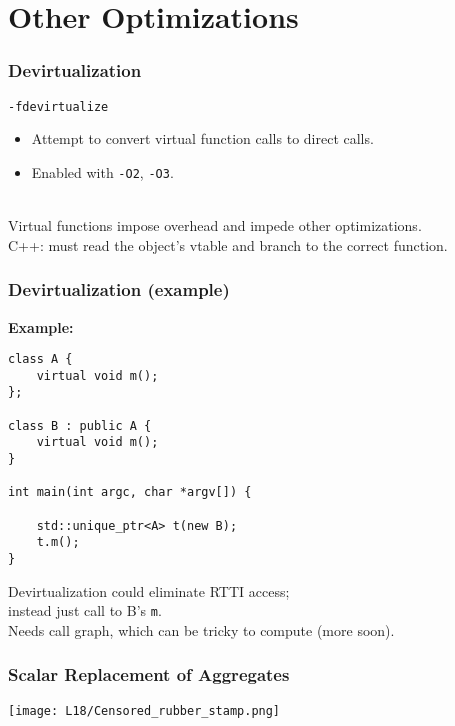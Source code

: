 \documentclass[aspectratio=43]{beamer}
\newenvironment{changemargin}[1]{%
  \begin{list}{}{%
    \setlength{\topsep}{0pt}%
    \setlength{\leftmargin}{#1}%
    \setlength{\rightmargin}{1em}
    \setlength{\listparindent}{\parindent}%
    \setlength{\itemindent}{\parindent}%
    \setlength{\parsep}{\parskip}%
  }%
  \item[]}{\end{list}}
\begin{document}
\section{Other Optimizations}
\begin{frame}
  \frametitle{Devirtualization}

  \begin{changemargin}{2cm}
  {\tt -fdevirtualize}

  \begin{itemize}
    \item Attempt to convert virtual function calls to direct calls.
    \item Enabled with {\tt -O2}, {\tt -O3}.
  \end{itemize}
~\\[1em]

  Virtual functions impose overhead and impede other optimizations.\\[1em]
  C++: must read
  the object's vtable and branch to
  the correct function.
  \end{changemargin}
\end{frame}

\begin{frame}[fragile]
  \frametitle{Devirtualization (example)}
  \begin{changemargin}{2cm}

  {\bf Example:}

  \begin{lstlisting}
class A {
    virtual void m();
};

class B : public A {
    virtual void m();
}

int main(int argc, char *argv[]) {

    std::unique_ptr<A> t(new B);
    t.m();
}
  \end{lstlisting}
  Devirtualization could eliminate RTTI access; \\ \qquad instead just call to B's {\tt m}.\\
  Needs call graph, which can be tricky to compute (more soon).
  \end{changemargin}
\end{frame}

\begin{frame}[fragile]
  \frametitle{Scalar Replacement of Aggregates}

\begin{center}
  \texttt{[image: L18/Censored\_rubber\_stamp.png]}
\end{center}
\end{frame}
\end{document}
